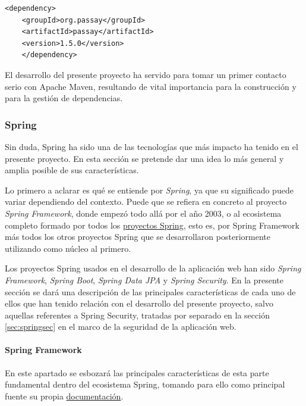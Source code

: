 \documentclass[a4paper]{article}
\begin{document}
    \begin{lstlisting}[caption=Declaración de dependencia en Apache Maven, label=list:maven_dependency]
    <dependency>
    <groupId>org.passay</groupId>
    <artifactId>passay</artifactId>
    <version>1.5.0</version>
    </dependency>
    \end{lstlisting}
    
    El desarrollo del presente proyecto ha servido para tomar un primer contacto serio con Apache Maven, resultando de vital importancia para la construcción y para la gestión de dependencias.
    
    \subsubsection{Spring} \label{sec:spring}
    Sin duda, Spring ha sido una de las tecnologías que más impacto ha tenido en el presente proyecto. En esta sección se pretende dar una idea lo más general y amplia posible de sus características.
    
    Lo primero a aclarar es qué se entiende por \emph{Spring}, ya que su significado puede variar dependiendo del contexto. Puede que se refiera en concreto al proyecto \emph{Spring Framework}, donde empezó todo allá por el año 2003, o al ecosistema completo formado por todos los \href{https://spring.io/projects}{proyectos Spring}, esto es, por Spring Framework más todos los otros proyectos Spring que se desarrollaron posteriormente utilizando como núcleo al primero.
    
    Los proyectos Spring usados en el desarrollo de la aplicación web han sido \emph{Spring Framework}, \emph{Spring Boot}, \emph{Spring Data JPA} y \emph{Spring Security}. En la presente sección se dará una descripción de las principales características de cada uno de ellos que han tenido relación con el desarrollo del presente proyecto, salvo aquellas referentes a Spring Security, tratadas por separado en la sección \ref{sec:springsec} en el marco de la seguridad de la aplicación web.
    
    \paragraph{Spring Framework} 
    En este apartado se esbozará las principales características de esta parte fundamental dentro del ecosistema Spring, tomando para ello como principal fuente su propia \href{https://docs.spring.io/spring/docs/current/spring-framework-reference/}{documentación}.
    
\end{document}
